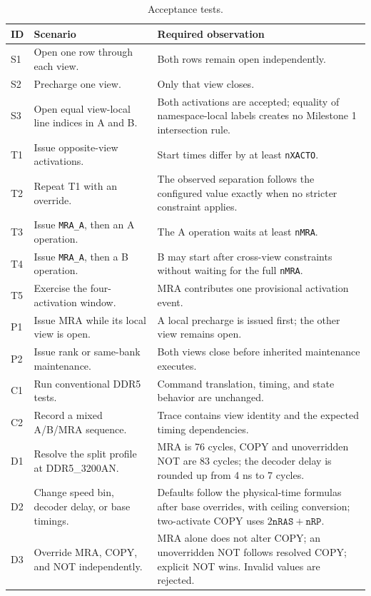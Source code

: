 \documentclass[9pt,twocolumn]{extarticle}
\newcommand{\cmd}[1]{\texttt{#1}}
\newcommand{\param}[1]{\texttt{#1}}
\begin{document}
\begin{table}[t]
\centering
\caption{Acceptance tests.}
\label{tab:tests}
\begin{tabularx}{\textwidth}{@{}p{}p{}X@{}}
\toprule
ID & Scenario & Required observation \\
\midrule
\rowcolor{DDRAMGrey}S1 & Open one row through each view. & Both rows remain open independently. \\
S2 & Precharge one view. & Only that view closes. \\
\rowcolor{DDRAMGrey}S3 & Open equal view-local line indices in A and B. & Both activations are accepted; equality of namespace-local labels creates no Milestone 1 intersection rule. \\
T1 & Issue opposite-view activations. & Start times differ by at least \param{nXACTO}. \\
\rowcolor{DDRAMGrey}T2 & Repeat T1 with an override. & The observed separation follows the configured value exactly when no stricter constraint applies. \\
T3 & Issue \cmd{MRA\_A}, then an A operation. & The A operation waits at least \param{nMRA}. \\
\rowcolor{DDRAMGrey}T4 & Issue \cmd{MRA\_A}, then a B operation. & B may start after cross-view constraints without waiting for the full \param{nMRA}. \\
T5 & Exercise the four-activation window. & MRA contributes one provisional activation event. \\
\rowcolor{DDRAMGrey}P1 & Issue MRA while its local view is open. & A local precharge is issued first; the other view remains open. \\
P2 & Issue rank or same-bank maintenance. & Both views close before inherited maintenance executes. \\
\rowcolor{DDRAMGrey}C1 & Run conventional DDR5 tests. & Command translation, timing, and state behavior are unchanged. \\
C2 & Record a mixed A/B/MRA sequence. & Trace contains view identity and the expected timing dependencies. \\
\rowcolor{DDRAMGrey}D1 & Resolve the split profile at DDR5\_3200AN. & MRA is 76 cycles, COPY and unoverridden NOT are 83 cycles; the decoder delay is rounded up from 4 ns to 7 cycles. \\
D2 & Change speed bin, decoder delay, or base timings. & Defaults follow the physical-time formulas after base overrides, with ceiling conversion; two-activate COPY uses $2\param{nRAS}+\param{nRP}$. \\
\rowcolor{DDRAMGrey}D3 & Override MRA, COPY, and NOT independently. & MRA alone does not alter COPY; an unoverridden NOT follows resolved COPY; explicit NOT wins. Invalid values are rejected. \\
\bottomrule
\end{tabularx}
\end{table}
\end{document}

